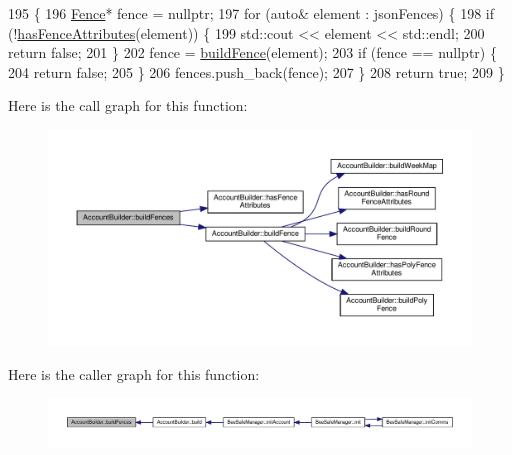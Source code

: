 \begin{DoxyCode}
195 \{
196     \hyperlink{class_fence}{Fence}* fence = \textcolor{keyword}{nullptr};
197     \textcolor{keywordflow}{for} (\textcolor{keyword}{auto}& element : jsonFences) \{
198         \textcolor{keywordflow}{if} (!\hyperlink{class_account_builder_a6d19e707adebbf868e26d66f9028a47d}{hasFenceAttributes}(element)) \{
199             std::cout << element << std::endl;
200             \textcolor{keywordflow}{return} \textcolor{keyword}{false};
201         \}
202         fence = \hyperlink{class_account_builder_ac5801a1130d7a1f84a66c45cfd6e0a8d}{buildFence}(element);
203         \textcolor{keywordflow}{if} (fence == \textcolor{keyword}{nullptr}) \{
204             \textcolor{keywordflow}{return} \textcolor{keyword}{false};
205         \}
206         fences.push\_back(fence);
207     \}
208     \textcolor{keywordflow}{return} \textcolor{keyword}{true};
209 \}
\end{DoxyCode}
Here is the call graph for this function\+:
\nopagebreak
\begin{figure}[H]
\begin{center}
\leavevmode
\includegraphics[width=350pt]{d9/daa/class_account_builder_a1992add0c2ab404664d4cbae326c6ec7_cgraph}
\end{center}
\end{figure}
Here is the caller graph for this function\+:
\nopagebreak
\begin{figure}[H]
\begin{center}
\leavevmode
\includegraphics[width=350pt]{d9/daa/class_account_builder_a1992add0c2ab404664d4cbae326c6ec7_icgraph}
\end{center}
\end{figure}
\mbox{\label{class_account_builder_a9a93946d8ba8908f6bcfa6b793cc6277}} 
